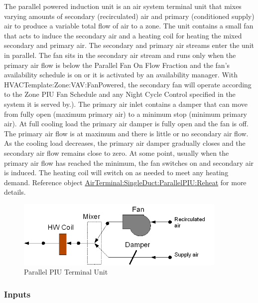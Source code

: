 The parallel powered induction unit is an air system terminal unit that mixes varying amounts of secondary (recirculated) air and primary (conditioned supply) air to produce a variable total flow of air to a zone. The unit contains a small fan that acts to induce the secondary air and a heating coil for heating the mixed secondary and primary air. The secondary and primary air streams enter the unit in parallel. The fan sits in the secondary air stream and runs only when the primary air flow is below the Parallel Fan On Flow Fraction and the fan's availability schedule is on or it is activated by an availability manager. With HVACTemplate:Zone:VAV:FanPowered, the secondary fan will operate according to the Zone PIU Fan Schedule and any Night Cycle Control specified in the system it is served by.). The primary air inlet contains a damper that can move from fully open (maximum primary air) to a minimum stop (minimum primary air). At full cooling load the primary air damper is fully open and the fan is off. The primary air flow is at maximum and there is little or no secondary air flow. As the cooling load decreases, the primary air damper gradually closes and the secondary air flow remains close to zero. At some point, usually when the primary air flow has reached the minimum, the fan switches on and secondary air is induced. The heating coil will switch on as needed to meet any heating demand. Reference object \hyperref[airterminalsingleductparallelpiureheat]{AirTerminal:SingleDuct:ParallelPIU:Reheat} for more details.

\begin{figure}[hbtp] %
\centering
\includegraphics[width=0.9\textwidth, height=0.9\textheight, keepaspectratio=true]{media/image609.png}
\caption{Parallel PIU Terminal Unit \protect \label{fig:parallel-piu-terminal-unit-001}}
\end{figure}

\subsubsection{Inputs}\label{inputs-2016-06-16-1620}

